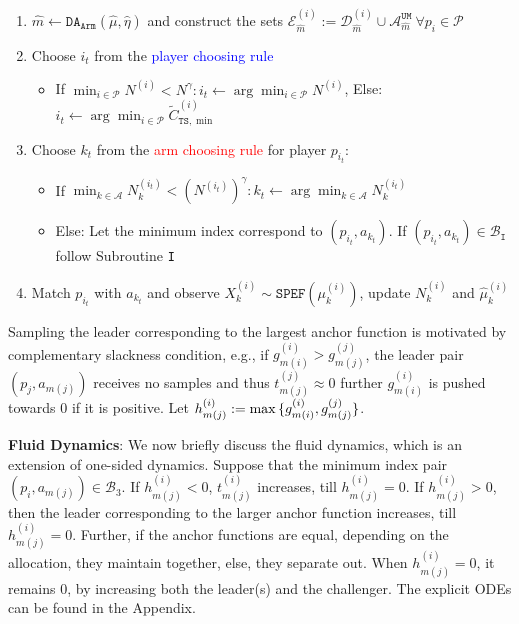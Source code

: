 \documentclass{article}
\newcommand{\UMA}{\mathcal{A}^{\texttt{UM}}}
\begin{document}
\begin{enumerate}[leftmargin=*, nosep,noitemsep, topsep=0pt]
    \item $\hat{m}\leftarrow \texttt{DA}_{\texttt{Arm}}(\hat{\mu},\hat{\eta})$ and
    construct the sets $\mathcal{E}_{\hat{m}}^{(i)}:=\mathcal{D}_{\hat{m}}^{(i)}\cup \UMA_{\hat{m}}\ \forall p_i\in\mathcal{P}$
    \item Choose $i_t$ from the \textcolor{blue}{player choosing rule}
\begin{itemize}[leftmargin=*, nosep,noitemsep, topsep=0pt,label=\textcolor{blue}{\rule{0.6ex}{0.6ex}}]
\item If $\min_{i\in\mathcal{P}} N^{(i)}<N^{\gamma}: i_t\leftarrow \arg\min_{i\in\mathcal{P}} N^{(i)}$, Else: $i_t\leftarrow \arg\min_{i\in\mathcal{P}} \tilde{C}^{(i)}_{\texttt{TS},\min}$
\end{itemize}
\item Choose $k_t$ from the \textcolor{red}{arm choosing rule} for player $p_{i_t}$: 
\begin{itemize}[leftmargin=*, nosep,noitemsep, topsep=0pt,label=\textcolor{red}{\rule{0.6ex}{0.6ex}}]
\item If $\min_{k\in\mathcal{A}} N_k^{(i_t)}<\left(N^{(i_t)}\right)^{\gamma}: k_t\leftarrow \arg\min_{k\in\mathcal{A}} N^{(i_t)}_k$
\item Else: Let the minimum index correspond to $(p_{i_t},a_{k_t})$. If $(p_{i_t},a_{k_t})\in\mathcal{B}_{\texttt{I}}$ follow Subroutine \texttt{I}
\end{itemize}
    \item Match $p_{i_t}$ with $a_{k_t}$ and observe $X^{(i)}_k\sim\texttt{SPEF}(\mu^{(i)}_k)$, update $N^{(i)}_k$ and $\hat{\mu}^{(i)}_k$
\end{enumerate}

Sampling the leader corresponding to the largest anchor function is motivated by complementary slackness condition, e.g., if $g^{(i)}_{m(i)}>g^{(j)}_{m(j)}$, the leader pair $(p_j,a_{m(j)})$ receives no samples and thus $t^{(j)}_{m(j)}\approx 0$ further $g^{(i)}_{m(i)}$ is pushed towards 0 if it is positive. Let $h^{(i)}_{m(j)}:=\max\small{\{g^{(i)}_{m(i)},g_{m(j)}^{(j)}\}}$.

\textbf{Fluid Dynamics}: We now briefly discuss the fluid dynamics, which is an extension of one-sided dynamics. Suppose that the minimum index pair $(p_i,a_{m(j)})\in\mathcal{B}_3$. If $h^{(i)}_{m(j)}<0$, $t^{(i)}_{m(j)}$ increases, till $h^{(i)}_{m(j)}=0$. If $h^{(i)}_{m(j)}>0$, then the leader corresponding to the larger anchor function increases, till $h^{(i)}_{m(j)}=0$. Further, if the anchor functions are equal, depending on the allocation, they maintain together, else, they separate out. When $h^{(i)}_{m(j)}=0$, it remains 0, by increasing both the leader(s) and the challenger. The explicit ODEs can be found in the Appendix.
\end{document}
